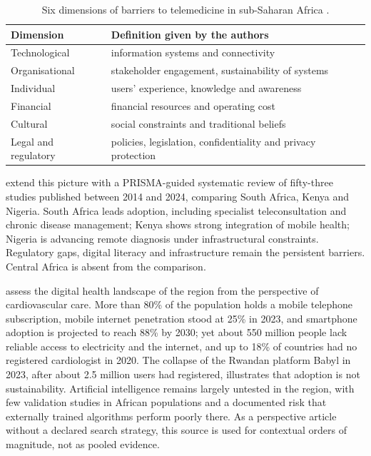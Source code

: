 \documentclass[12pt,a4paper,oneside]{report}
\begin{document}
\begin{table}[htbp]
\centering\small
\caption{Six dimensions of barriers to telemedicine in sub-Saharan Africa \parencite{dodoo2022}.}\label{tab:barriers}
\begin{tabularx}{\textwidth}{@{}>{\raggedright\arraybackslash}p{3.4cm} X@{}}
\toprule
\textbf{Dimension} & \textbf{Definition given by the authors} \\
\midrule
Technological & information systems and connectivity \\
Organisational & stakeholder engagement, sustainability of systems \\
Individual & users' experience, knowledge and awareness \\
Financial & financial resources and operating cost \\
Cultural & social constraints and traditional beliefs \\
Legal and regulatory & policies, legislation, confidentiality and privacy protection \\
\bottomrule
\end{tabularx}
\end{table}

\Textcite{agbeyangi2025} extend this picture with a PRISMA-guided systematic review of fifty-three studies published between 2014 and 2024, comparing South Africa, Kenya and Nigeria. South Africa leads adoption, including specialist teleconsultation and chronic disease management; Kenya shows strong integration of mobile health; Nigeria is advancing remote diagnosis under infrastructural constraints. Regulatory gaps, digital literacy and infrastructure remain the persistent barriers. Central Africa is absent from the comparison.

\Textcite{segun2025} assess the digital health landscape of the region from the perspective of cardiovascular care. More than 80\% of the population holds a mobile telephone subscription, mobile internet penetration stood at 25\% in 2023, and smartphone adoption is projected to reach 88\% by 2030; yet about 550 million people lack reliable access to electricity and the internet, and up to 18\% of countries had no registered cardiologist in 2020. The collapse of the Rwandan platform Babyl in 2023, after about 2.5 million users had registered, illustrates that adoption is not sustainability. Artificial intelligence remains largely untested in the region, with few validation studies in African populations and a documented risk that externally trained algorithms perform poorly there. As a perspective article without a declared search strategy, this source is used for contextual orders of magnitude, not as pooled evidence.
\end{document}
